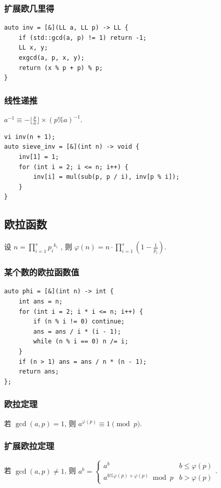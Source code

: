 \documentclass[UTF8, a4paper, titlepage, twoside]{ctexart}
\begin{document}
\subsubsection{ 扩展欧几里得 }
\begin{lstlisting}
auto inv = [&](LL a, LL p) -> LL {
    if (std::gcd(a, p) != 1) return -1;
    LL x, y;
    exgcd(a, p, x, y);
    return (x % p + p) % p;
}
\end{lstlisting}

\subsubsection{ 线性递推 }
$a^{-1} \equiv -\lfloor \frac{p}{a} \rfloor \times (p\%a)^{-1}$.
\begin{lstlisting}
vi inv(n + 1);
auto sieve_inv = [&](int n) -> void {
    inv[1] = 1;
    for (int i = 2; i <= n; i++) {
        inv[i] = mul(sub(p, p / i), inv[p % i]);
    }
}
\end{lstlisting}

\subsection{ 欧拉函数 }
设 $n = \prod_{i = 1}^{s}{p_i}^{k_i}$ , 则 $\varphi(n) = n \cdot \prod_{i = 1}^{s}(1 - \frac{1}{p_i})$.

\subsubsection{ 某个数的欧拉函数值 }
\begin{lstlisting}
auto phi = [&](int n) -> int {
    int ans = n;
    for (int i = 2; i * i <= n; i++) {
        if (n % i != 0) continue;
        ans = ans / i * (i - 1);
        while (n % i == 0) n /= i;
    }
    if (n > 1) ans = ans / n * (n - 1);
    return ans;
};
\end{lstlisting}
 
\subsubsection{ 欧拉定理 }
若 $\gcd(a, p) = 1$, 则 $a^{\varphi(p)} \equiv1 \pmod{p}$.

\subsubsection{ 扩展欧拉定理 }
若 $\gcd(a, p) \neq 1$, 则
$a^b = 
\left \{ \begin{array}{cl}
a^b & b \leqslant \varphi(p) \\ 
a ^{b \% \varphi(p) + \varphi(p)} \bmod p & b > \varphi(p) 
\end{array} \right.
$.
\end{document}
